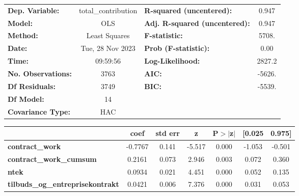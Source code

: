 \begin{center}
\begin{tabular}{lclc}
\toprule
\textbf{Dep. Variable:}                     & total\_contribution & \textbf{  R-squared (uncentered):}      &     0.947   \\
\textbf{Model:}                             &         OLS         & \textbf{  Adj. R-squared (uncentered):} &     0.947   \\
\textbf{Method:}                            &    Least Squares    & \textbf{  F-statistic:       }          &     5708.   \\
\textbf{Date:}                              &   Tue, 28 Nov 2023  & \textbf{  Prob (F-statistic):}          &     0.00    \\
\textbf{Time:}                              &       09:59:56      & \textbf{  Log-Likelihood:    }          &    2827.2   \\
\textbf{No. Observations:}                  &          3763       & \textbf{  AIC:               }          &    -5626.   \\
\textbf{Df Residuals:}                      &          3749       & \textbf{  BIC:               }          &    -5539.   \\
\textbf{Df Model:}                          &            14       & \textbf{                     }          &             \\
\textbf{Covariance Type:}                   &         HAC         & \textbf{                     }          &             \\
\bottomrule
\end{tabular}
\begin{tabular}{lcccccc}
                                            & \textbf{coef} & \textbf{std err} & \textbf{z} & \textbf{P$> |$z$|$} & \textbf{[0.025} & \textbf{0.975]}  \\
\midrule
\textbf{contract\_work}                     &      -0.7767  &        0.141     &    -5.517  &         0.000        &       -1.053    &       -0.501     \\
\textbf{contract\_work\_cumsum}             &       0.2161  &        0.073     &     2.946  &         0.003        &        0.072    &        0.360     \\
\textbf{ntek}                               &       0.0934  &        0.021     &     4.451  &         0.000        &        0.052    &        0.135     \\
\textbf{tilbuds\_og\_entreprisekontrakt}    &       0.0421  &        0.006     &     7.376  &         0.000        &        0.031    &        0.053     \\

\end{tabular}
\end{center}
